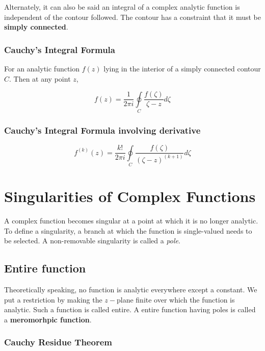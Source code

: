 \documentclass[letterpaper,11pt]{article}
\begin{document}
Alternately, it can also be said an integral of a complex analytic function is independent of the contour followed. The contour has a constraint that it must be \textbf{simply connected}.

\subsubsection*{Cauchy's Integral Formula}

For an analytic function $f(z)$ lying in the interior of a simply connected contour $C$. Then at any point $z$,

\begin{equation}
 f(z)  = \frac{1}{2\pi i} \oint \limits_C \frac{f(\zeta)}{\zeta - z} d\zeta
\end{equation}

\subsubsection*{Cauchy's Integral Formula involving derivative}

\begin{equation}
 f^{(k)}(z)  = \frac{k!}{2\pi i} \oint \limits_C \frac{f(\zeta)}{(\zeta - z)^{(k+1)}} d\zeta
\end{equation}



\section*{Singularities of Complex Functions}


A complex function becomes singular at a point at which it is no longer analytic. To define a singularity, a branch at which the function is single-valued needs to be selected. A non-removable singularity is called a \emph{pole}.

\subsection*{Entire function}

Theoretically speaking, no function is analytic everywhere except a constant. We put a restriction by making the $z-$plane finite over which the function is analytic. Such a function is called entire. A entire function having poles is called a \textbf{meromorhpic function}.

\subsubsection*{Cauchy Residue Theorem}
\end{document}
